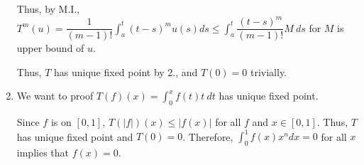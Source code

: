 \documentclass[12pt]{article}
\begin{document}
\begin{enumerate}
    Thus, by M.I., $T^m(u) = \dfrac{1}{(m-1)!}\displaystyle\int_{a}^{t} (t-s)^m u(s) ds \leq \displaystyle\int_{a}^{t} \dfrac{(t-s)^m}{(m-1)!} M\ ds$ 
    for $M$ is upper bound of $u$.

    Thus, $T$ has unique fixed point by 2., and $T(0) = 0$ trivially.

    \item We want to proof $T(f)(x) = \displaystyle\int_0^x f(t)t\ dt$ has unique fixed point.
    
    Since $f$ is on $[0, 1]$, $T(|f|)(x) \leq |f(x)|$ for all $f$ and $x\in [0, 1]$.
    Thus, $T$ has unique fixed point and $T(0) = 0$. 
    Therefore, $\int_{0}^{1} f(x) x^n dx = 0$ for all $x$ implies that $f(x) = 0$.
\end{enumerate}
\end{document}
